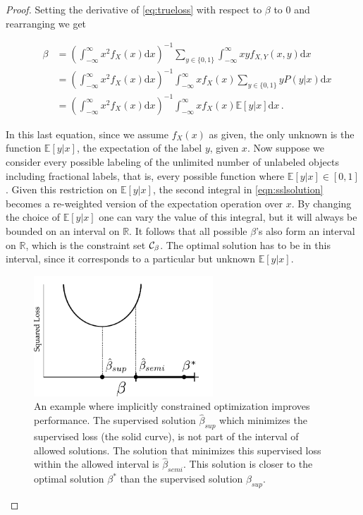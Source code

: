 \documentclass{elsarticle}
\begin{document}
\begin{proof}

Setting the derivative of \eqref{eq:trueloss} with respect to $\beta$ to $0$ and rearranging we get

\begin{eqnarray}
&\beta & = \left( \int_{-\infty}^{\infty} { x^2 f_X(x) \mathrm{d}x} \right)^{-1} \sum_{y \in \{0,1\}} \int_{-\infty}^{\infty} { x y f_{X,Y}(x,y) \mathrm{d}x } \\
& & =    \left( \int_{-\infty}^{\infty} { x^2 f_X(x) \mathrm{d}x} \right)^{-1}  \int_{-\infty}^{\infty} { x f_X(x) \sum_{y \in \{0,1\}} y P(y|x) \mathrm{d}x} \\
& & =   \left( \int_{-\infty}^{\infty} { x^2 f_X(x) \mathrm{d}x} \right)^{-1}  \int_{-\infty}^{\infty} { x f_X(x) \mathbb{E}[y|x] \mathrm{d}x} \, . \label{eqn:sslsolution}
\end{eqnarray}

In this last equation, since we assume $f_X(x)$ as given, the only unknown is the function $\mathbb{E}[y|x]$, the expectation of the label $y$, given $x$. Now suppose we consider every possible labeling of the unlimited number of unlabeled objects including fractional labels, that is, every possible function where $\mathbb{E}[y|x] \in [0,1]$. Given this restriction on $\mathbb{E}[y|x]$, the second integral in \eqref{eqn:sslsolution} becomes a re-weighted version of the expectation operation over $x$. By changing the choice of $\mathbb{E}[y|x]$ one can vary the value of this integral, but it will always be bounded on an interval on $\mathbb{R}$. It follows that all possible $\beta$'s also form an interval on $\mathbb{R}$, which is the constraint set $\mathcal{C}_{\beta}$. The optimal solution has to be in this interval, since it corresponds to a particular but unknown $\mathbb{E}[y|x]$.

\begin{figure}[t] 
  \centering
      \includegraphics[width=0.6\textwidth]{../figures/1Dconstrainedspace.pdf}
  \caption{An example where implicitly constrained optimization improves performance. The supervised solution $\hat{\beta}_{sup}$ which minimizes the supervised loss (the solid curve), is not part of the interval of allowed solutions. The solution that minimizes this supervised loss within the allowed interval is $\hat{\beta}_{semi}$. This solution is closer to the optimal solution ${\beta}^{\ast}$ than the supervised solution $\hat{\beta}_{sup}$.} \label{fig:constrainedproblem}
\end{figure}


\end{proof}
\end{document}
